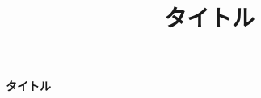 \documentclass[10pt, a4j, twocolumn]{jsarticle}
\title{タイトル}
\begin{document}
\noindent
\begin{minipage}{\linewidth}
    {\LARGE \textbf{タイトル}} \\[2mm]
\end{minipage}
\end{document}
